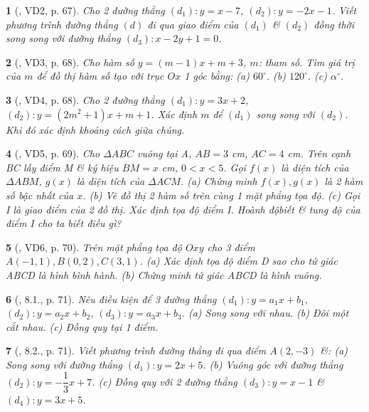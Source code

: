 \documentclass{article}
\newtheorem{baitoan}{}
\begin{document}
\begin{baitoan}[\cite{Binh_boi_duong_Toan_9_tap_1}, VD2, p. 67]
	Cho 2 đường thẳng $(d_1):y = x - 7$, $(d_2):y = -2x - 1$. Viết phương trình đường thẳng $(d)$ đi qua giao điểm của $(d_1)$ \& $(d_2)$ đồng thời song song với đường thẳng $(d_3):x - 2y + 1 = 0$.
\end{baitoan}

\begin{baitoan}[\cite{Binh_boi_duong_Toan_9_tap_1}, VD3, p. 68]
	Cho hàm số $y = (m - 1)x + m + 3$, $m$: tham số. Tìm giá trị của $m$ để đồ thị hàm số tạo với trục $Ox$ 1 góc bằng: (a) $60^\circ$. (b) $120^\circ$. (c) $\alpha^\circ$.
\end{baitoan}

\begin{baitoan}[\cite{Binh_boi_duong_Toan_9_tap_1}, VD4, p. 68]
	Cho 2 đường thẳng $(d_1):y = 3x + 2$, $(d_2):y = (2m^2 + 1)x + m + 1$. Xác định $m$ để $(d_1)$ song song với $(d_2)$. Khi đó xác định khoảng cách giữa chúng.
\end{baitoan}

\begin{baitoan}[\cite{Binh_boi_duong_Toan_9_tap_1}, VD5, p. 69]
	Cho $\Delta ABC$ vuông tại A, $AB = 3$ {\rm cm}, $AC = 4$ {\rm cm}. Trên cạnh BC lấy điểm M \& ký hiệu $BM = x$ {\rm cm}, $0 < x < 5$. Gọi $f(x)$ là diện tích của $\Delta ABM$, $g(x)$ là diện tích của $\Delta ACM$. (a) Chứng minh $f(x),g(x)$ là 2 hàm số bậc nhất của $x$. (b) Vẽ đồ thị 2 hàm số trên cùng 1 mặt phẳng tọa độ. (c) Gọi I là giao điểm của 2 đồ thị. Xác định tọa độ điểm I. Hoành độbiết \& tung độ của điểm I cho ta biết điều gì?
\end{baitoan}

\begin{baitoan}[\cite{Binh_boi_duong_Toan_9_tap_1}, VD6, p. 70]
	Trên mặt phẳng tọa độ $Oxy$ cho 3 điểm $A(-1,1),B(0,2),C(3,1)$. (a) Xác định tọa độ điểm D sao cho tứ giác ABCD là hình bình hành. (b) Chứng minh tứ giác ABCD là hình vuông.
\end{baitoan}

\begin{baitoan}[\cite{Binh_boi_duong_Toan_9_tap_1}, 8.1., p. 71]
	Nêu điều kiện để 3 đường thẳng $(d_1):y = a_1x + b_1$, $(d_2):y = a_2x + b_2$, $(d_3):y = a_3x + b_3$. (a) Song song với nhau. (b) Đôi một cắt nhau. (c) Đồng quy tại 1 điểm.
\end{baitoan}

\begin{baitoan}[\cite{Binh_boi_duong_Toan_9_tap_1}, 8.2., p. 71]
	Viết phương trình đường thẳng đi qua điểm $A(2,-3)$ \&: (a) Song song với đường thẳng $(d_1):y = 2x + 5$. (b) Vuông góc với đường thẳng $(d_2):y = -\dfrac{1}{3}x + 7$. (c) Đồng quy với 2 đường thẳng $(d_3):y = x - 1$ \& $(d_4):y = 3x + 5$.
\end{baitoan}
\end{document}
